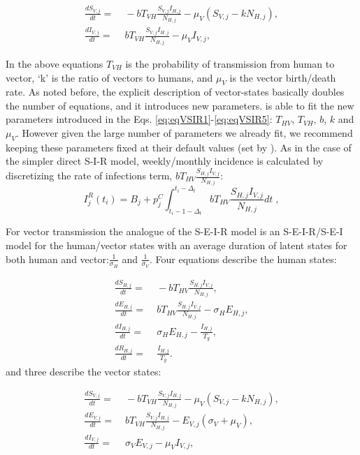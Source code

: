 \documentclass[a4paper]{article}
\begin{document}
\begin{align}
\frac{dS_{V,j}}{dt} =&\; - b T_{VH}\frac{S_{V,j} I_{H,j}}{N_{H,j}} - \mu_{V}(S_{V,j} - k N_{H,j}), \label{eq:eqVSIR4} \\
\frac{dI_{V,j}}{dt} =&\;   b T_{VH}\frac{S_{V,j} I_{H,j}}{N_{H,j}} - \mu_{V} I_{V,j},  \label{eq:eqVSIR5}
\end{align}

In the above equations $T_{VH}$ is the probability of transmission from human to vector, `k' is the ratio of vectors to humans, and $\mu_V$ is the vector birth/death rate. As noted before, the explicit description of vector-states basically doubles the number of equations, and it introduces new parameters.   is able to fit the new parameters introduced in the Eqs. \ref{eq:eqVSIR1}-\ref{eq:eqVSIR5}: $T_{HV}$, $T_{VH}$, $b$, $k$ and $\mu_V$. However given the large number of parameters we already fit, we recommend keeping these parameters fixed at their default values (set by ).  As in the case of the simpler direct S-I-R model, weekly/monthly incidence is calculated by discretizing the rate of infections term, $b T_{HV}\frac{S_{H,j} I_{V,j}}{N_{H,j}}$:
\begin{equation}
I_j^R(t_i) = B_j + p_j^C \int_{t_i-1-\Delta_t}^{t_i-\Delta_t} b T_{HV}\frac{S_{H,j} I_{V,j}}{N_{H,j}} dt\;,
\label{eq:VInc}
\end{equation}

For vector transmission the analogue of the S-E-I-R model is an S-E-I-R/S-E-I model for the human/vector states with an average duration of latent states for both human and vector:$\frac{1}{\sigma_H}$ and $\frac{1}{\sigma_V}$. Four equations describe the human states:

\begin{align}
\frac{dS_{H,j}}{dt} =&\; - b T_{HV}\frac{S_{H,j} I_{V,j}}{N_{H,j}}, \label{eq:eqVSEIR1} \\
\frac{dE_{H,j}}{dt} =&\;   b T_{HV}\frac{S_{H,j} I_{V,j}}{N_{H,j}} - \sigma_{H} E_{H,j},  \label{eq:eqVSEIR2} \\
\frac{dI_{H,j}}{dt} =&\; \sigma_{H} E_{H,j} - \frac{I_{H,j}}{T_g},  \label{eq:eqVSEIR3} \\
\frac{dR_{H,j}}{dt} =&\; \frac{I_{H,j}}{T_g}. \label{eq:eqVSEIR4}
\end{align}
and three describe the vector states:

\begin{align}
\frac{dS_{V,j}}{dt} =&\; - b T_{VH}\frac{S_{V,j} I_{H,j}}{N_{H,j}} - \mu_{V}(S_{V,j} - k N_{H,j}), \label{eq:eqVSEIR4} \\
\frac{dE_{V,j}}{dt} =&\;   b T_{VH}\frac{S_{V,j} I_{H,j}}{N_{H,j}} - E_{V,j} (\sigma_{V} + \mu_V),  \label{eq:eqVSEIR2} \\
\frac{dI_{V,j}}{dt} =&\;   \sigma_{V} E_{V,j} - \mu_{V} I_{V,j},  \label{eq:eqVSEIR5}
\end{align}
\end{document}

